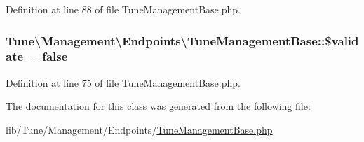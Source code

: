 Definition at line 88 of file Tune\-Management\-Base.\-php.

\hypertarget{classTune_1_1Management_1_1Endpoints_1_1TuneManagementBase_a264eed27b0a1c963808fc7eab6da98bc}{
\subsubsection[{\$validate}]{\setlength{\rightskip}{0pt plus 5cm}Tune\textbackslash{}\-Management\textbackslash{}\-Endpoints\textbackslash{}\-Tune\-Management\-Base\-::\$validate = false\hspace{0.3cm}{\ttfamily [protected]}}}\label{classTune_1_1Management_1_1Endpoints_1_1TuneManagementBase_a264eed27b0a1c963808fc7eab6da98bc}


Definition at line 75 of file Tune\-Management\-Base.\-php.



The documentation for this class was generated from the following file\-:\begin{DoxyCompactItemize}
\item 
lib/\-Tune/\-Management/\-Endpoints/\hyperlink{TuneManagementBase_8php}{Tune\-Management\-Base.\-php}\end{DoxyCompactItemize}

